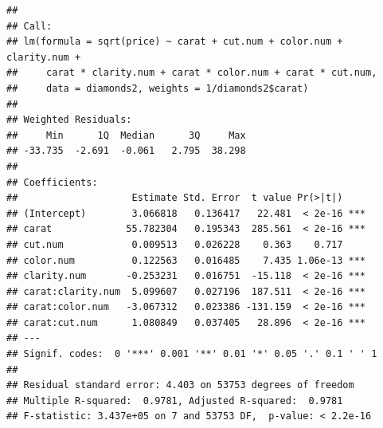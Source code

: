 \documentclass[
]{book}
\newenvironment{Shaded}{\begin{snugshade}}{\end{snugshade}}
\newcommand{\AttributeTok}[1]{\textcolor[rgb]{0.77,0.63,0.00}{#1}}
\newcommand{\DecValTok}[1]{\textcolor[rgb]{0.00,0.00,0.81}{#1}}
\newcommand{\FloatTok}[1]{\textcolor[rgb]{0.00,0.00,0.81}{#1}}
\newcommand{\FunctionTok}[1]{\textcolor[rgb]{0.00,0.00,0.00}{#1}}
\newcommand{\NormalTok}[1]{#1}
\newcommand{\OtherTok}[1]{\textcolor[rgb]{0.56,0.35,0.01}{#1}}
\newcommand{\SpecialCharTok}[1]{\textcolor[rgb]{0.00,0.00,0.00}{#1}}
\begin{document}
\begin{Shaded}
\end{Shaded}

\begin{verbatim}
## 
## Call:
## lm(formula = sqrt(price) ~ carat + cut.num + color.num + clarity.num + 
##     carat * clarity.num + carat * color.num + carat * cut.num, 
##     data = diamonds2, weights = 1/diamonds2$carat)
## 
## Weighted Residuals:
##     Min      1Q  Median      3Q     Max 
## -33.735  -2.691  -0.061   2.795  38.298 
## 
## Coefficients:
##                    Estimate Std. Error  t value Pr(>|t|)    
## (Intercept)        3.066818   0.136417   22.481  < 2e-16 ***
## carat             55.782304   0.195343  285.561  < 2e-16 ***
## cut.num            0.009513   0.026228    0.363    0.717    
## color.num          0.122563   0.016485    7.435 1.06e-13 ***
## clarity.num       -0.253231   0.016751  -15.118  < 2e-16 ***
## carat:clarity.num  5.099607   0.027196  187.511  < 2e-16 ***
## carat:color.num   -3.067312   0.023386 -131.159  < 2e-16 ***
## carat:cut.num      1.080849   0.037405   28.896  < 2e-16 ***
## ---
## Signif. codes:  0 '***' 0.001 '**' 0.01 '*' 0.05 '.' 0.1 ' ' 1
## 
## Residual standard error: 4.403 on 53753 degrees of freedom
## Multiple R-squared:  0.9781, Adjusted R-squared:  0.9781 
## F-statistic: 3.437e+05 on 7 and 53753 DF,  p-value: < 2.2e-16
\end{verbatim}
\end{document}
